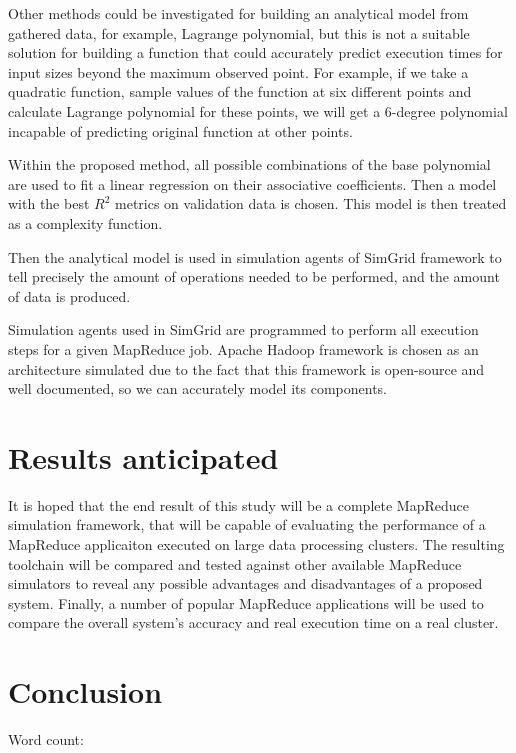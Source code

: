 \documentclass[conference]{IEEEtran} \IEEEoverridecommandlockouts
\begin{document}
    Other methods could be investigated for building an analytical model from
    gathered data, for example, Lagrange polynomial, but this is not a suitable
    solution for building a function that could accurately predict execution
    times for input sizes beyond the maximum observed point. For example, if we
    take a quadratic function, sample values of the function at six different
    points and calculate Lagrange polynomial for these points, we will get a
    6-degree polynomial incapable of predicting original function at other
    points. 

    Within the proposed method, all possible combinations of the base
    polynomial are used to fit a linear regression on their associative
    coefficients. Then a model with the best $R^2$ metrics on validation data
    is chosen. This model is then treated as a complexity function.

    Then the analytical model is used in simulation agents of
    SimGrid\cite{simgrid} framework to tell precisely the amount of operations
    needed to be performed, and the amount of data is produced.

    Simulation agents used in SimGrid are programmed to perform all execution
    steps for a given MapReduce job. Apache Hadoop framework is chosen as an
    architecture simulated due to the fact that this framework is open-source
    and well documented, so we can accurately model its components. 


    \section{Results anticipated}

    It is hoped that the end result of this study will be a complete MapReduce
    simulation framework, that will be capable of evaluating the performance of
    a MapReduce applicaiton executed on large data processing clusters. The
    resulting toolchain will be compared and tested against other available
    MapReduce simulators to reveal any possible advantages and disadvantages of
    a proposed system. Finally, a number of popular MapReduce applications will
    be used to compare the overall system's accuracy and real execution time on
    a real cluster. 

    \section{Conclusion}

    
    \printbibliography

    \vspace{10 mm}

    \begin{flushright}
        Word count: 
    \end{flushright}
\end{document}
